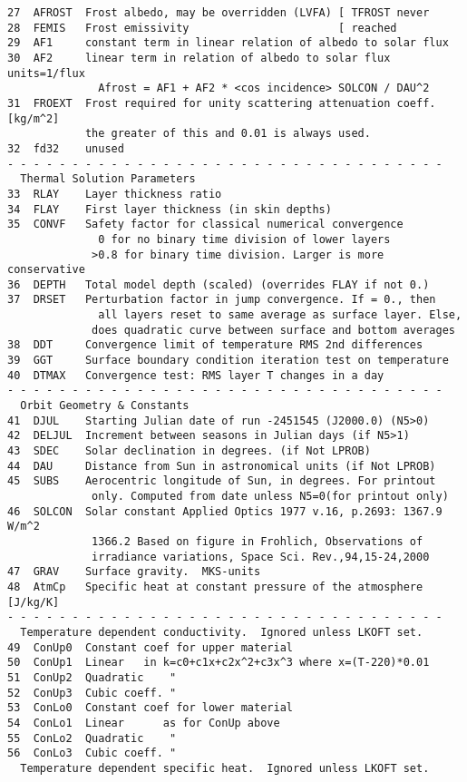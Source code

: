 \documentclass[draft]{article}  %
\begin{document}
\begin{verbatim}
27  AFROST  Frost albedo, may be overridden (LVFA) [ TFROST never
28  FEMIS   Frost emissivity                       [ reached
29  AF1     constant term in linear relation of albedo to solar flux
30  AF2     linear term in relation of albedo to solar flux units=1/flux
              Afrost = AF1 + AF2 * <cos incidence> SOLCON / DAU^2
31  FROEXT  Frost required for unity scattering attenuation coeff. [kg/m^2]
            the greater of this and 0.01 is always used.
32  fd32    unused
- - - - - - - - - - - - - - - - - - - - - - - - - - - - - - - - - - 
  Thermal Solution Parameters
33  RLAY    Layer thickness ratio
34  FLAY    First layer thickness (in skin depths)
35  CONVF   Safety factor for classical numerical convergence
              0 for no binary time division of lower layers
             >0.8 for binary time division. Larger is more conservative
36  DEPTH   Total model depth (scaled) (overrides FLAY if not 0.)
37  DRSET   Perturbation factor in jump convergence. If = 0., then
              all layers reset to same average as surface layer. Else,
             does quadratic curve between surface and bottom averages
38  DDT     Convergence limit of temperature RMS 2nd differences
39  GGT     Surface boundary condition iteration test on temperature
40  DTMAX   Convergence test: RMS layer T changes in a day
- - - - - - - - - - - - - - - - - - - - - - - - - - - - - - - - - - 
  Orbit Geometry & Constants
41  DJUL    Starting Julian date of run -2451545 (J2000.0) (N5>0)
42  DELJUL  Increment between seasons in Julian days (if N5>1)
43  SDEC    Solar declination in degrees. (if Not LPROB)
44  DAU     Distance from Sun in astronomical units (if Not LPROB)
45  SUBS    Aerocentric longitude of Sun, in degrees. For printout 
             only. Computed from date unless N5=0(for printout only)
46  SOLCON  Solar constant Applied Optics 1977 v.16, p.2693: 1367.9 W/m^2
             1366.2 Based on figure in Frohlich, Observations of 
             irradiance variations, Space Sci. Rev.,94,15-24,2000
47  GRAV    Surface gravity.  MKS-units
48  AtmCp   Specific heat at constant pressure of the atmosphere [J/kg/K]
- - - - - - - - - - - - - - - - - - - - - - - - - - - - - - - - - - 
  Temperature dependent conductivity.  Ignored unless LKOFT set.
49  ConUp0  Constant coef for upper material 
50  ConUp1  Linear   in k=c0+c1x+c2x^2+c3x^3 where x=(T-220)*0.01
51  ConUp2  Quadratic    " 
52  ConUp3  Cubic coeff. "
53  ConLo0  Constant coef for lower material 
54  ConLo1  Linear      as for ConUp above
55  ConLo2  Quadratic    "
56  ConLo3  Cubic coeff. "
  Temperature dependent specific heat.  Ignored unless LKOFT set.

\end{verbatim}
\end{document}
